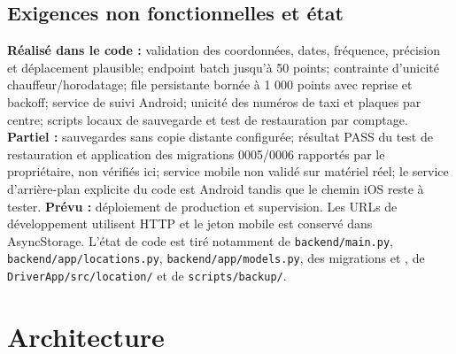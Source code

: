 \documentclass[12pt,a4paper]{article}
\begin{document}
\subsection{Exigences non fonctionnelles et état}
\textbf{Réalisé dans le code :} validation des coordonnées, dates, fréquence, précision et déplacement plausible; endpoint batch jusqu'à 50 points; contrainte d'unicité chauffeur/horodatage; file persistante bornée à 1 000 points avec reprise et backoff; service de suivi Android; unicité des numéros de taxi et plaques par centre; scripts locaux de sauvegarde et test de restauration par comptage. \textbf{Partiel :} sauvegardes sans copie distante configurée; résultat PASS du test de restauration et application des migrations 0005/0006 rapportés par le propriétaire, non vérifiés ici; service mobile non validé sur matériel réel; le service d'arrière-plan explicite du code est Android tandis que le chemin iOS reste à tester. \textbf{Prévu :} déploiement de production et supervision. Les URLs de développement utilisent HTTP et le jeton mobile est conservé dans AsyncStorage. L'état de code est tiré notamment de \texttt{backend/main.py}, \texttt{backend/app/locations.py}, \texttt{backend/app/models.py}, des migrations  et , de \texttt{DriverApp/src/location/} et de \texttt{scripts/backup/}.

\section{Architecture}
\end{document}
